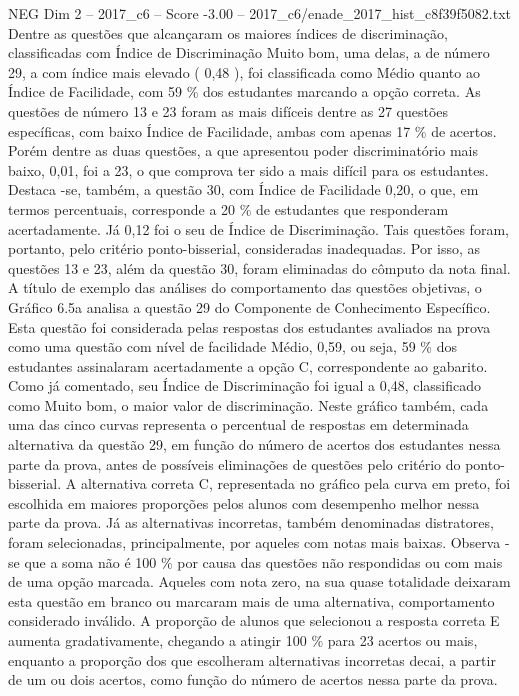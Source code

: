 \begin{textsample}{NEG Dim 2 – 2017\_c6 – Score -3.00 – 2017\_c6/enade\_2017\_hist\_c8f39f5082.txt}
Dentre as questões que alcançaram os maiores índices de discriminação, classificadas com Índice de Discriminação Muito bom, uma delas, a de número 29, a com índice mais elevado ( 0,48 ), foi classificada como Médio quanto ao Índice de Facilidade, com 59 \% dos estudantes marcando a opção correta.
As questões de número 13 e 23 foram as mais difíceis dentre as 27 questões específicas, com baixo Índice de Facilidade, ambas com apenas 17 \% de acertos.
Porém dentre as duas questões, a que apresentou poder discriminatório mais baixo, 0,01, foi a 23, o que comprova ter sido a mais difícil para os estudantes.
Destaca -se, também, a questão 30, com Índice de Facilidade 0,20, o que, em termos percentuais, corresponde a 20 \% de estudantes que responderam acertadamente.
Já 0,12 foi o seu de Índice de Discriminação.
Tais questões foram, portanto, pelo critério ponto-bisserial, consideradas inadequadas.
Por isso, as questões 13 e 23, além da questão 30, foram eliminadas do cômputo da nota final.
A título de exemplo das análises do comportamento das questões objetivas, o Gráfico 6.5a analisa a questão 29 do Componente de Conhecimento Específico.
Esta questão foi considerada pelas respostas dos estudantes avaliados na prova como uma questão com nível de facilidade Médio, 0,59, ou seja, 59 \% dos estudantes assinalaram acertadamente a opção C, correspondente ao gabarito.
Como já comentado, seu Índice de Discriminação foi igual a 0,48, classificado como Muito bom, o maior valor de discriminação.
Neste gráfico também, cada uma das cinco curvas representa o percentual de respostas em determinada alternativa da questão 29, em função do número de acertos dos estudantes nessa parte da prova, antes de possíveis eliminações de questões pelo critério do ponto-bisserial.
A alternativa correta C, representada no gráfico pela curva em preto, foi escolhida em maiores proporções pelos alunos com desempenho melhor nessa parte da prova.
Já as alternativas incorretas, também denominadas distratores, foram selecionadas, principalmente, por aqueles com notas mais baixas.
Observa -se que a soma não é 100 \% por causa das questões não respondidas ou com mais de uma opção marcada.
Aqueles com nota zero, na sua quase totalidade deixaram esta questão em branco ou marcaram mais de uma alternativa, comportamento considerado inválido.
A proporção de alunos que selecionou a resposta correta E aumenta gradativamente, chegando a atingir 100 \% para 23 acertos ou mais, enquanto a proporção dos que escolheram alternativas incorretas decai, a partir de um ou dois acertos, como função do número de acertos nessa parte da prova.

\end{textsample}
